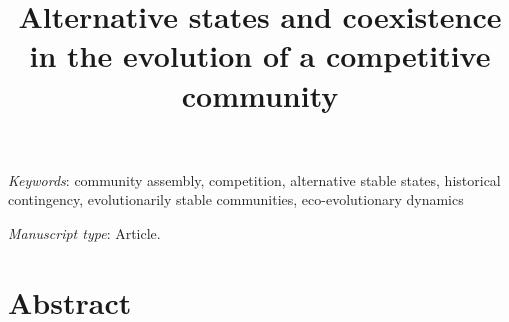 \documentclass[11pt]{article}
\title{Alternative states and coexistence in the evolution of a competitive community}
\author{}
\date{}
\begin{document}
\maketitle


%
%
%
%


\textit{Keywords}: {
community assembly,
competition,
alternative stable states,
historical contingency,
evolutionarily stable communities,
eco-evolutionary dynamics}


\bigskip

\textit{Manuscript type}: Article.

\bigskip


\linenumbers{}
\modulolinenumbers[2]

\newpage{}



\section*{Abstract}


\newpage{}









\end{document}
